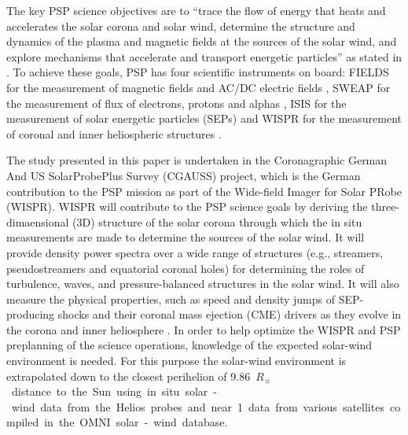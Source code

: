 \documentclass[]{aa}
\newcommand{\Rs}{$R_\sun{}$}
\begin{document}
        The key PSP science objectives are to “trace the flow of energy that heats and accelerates the solar corona and solar wind, determine the structure and dynamics of the plasma and magnetic fields at the sources of the solar wind, and explore mechanisms that accelerate and transport energetic particles” as stated in \citet{Fox2015}. To achieve these goals, PSP has four scientific instruments on board: FIELDS for the measurement of magnetic fields and AC/DC electric fields \citep{Bale2016}, SWEAP for the measurement of flux of electrons, protons and alphas \citep{Kasper2016}, IS\sun{}IS for the measurement of solar energetic particles (SEPs) \citep{McComas2016} and WISPR for the measurement of coronal and inner heliospheric structures \citep{Vourlidas2016}.

        The study presented in this paper is undertaken in the Coronagraphic German And US SolarProbePlus Survey (CGAUSS) project, which is the German contribution to the PSP mission as part of the Wide-field Imager for Solar PRobe (WISPR). WISPR will contribute to the PSP science goals by deriving the three-dimaensional (3D) structure of the solar corona through which the in situ measurements are made to determine the sources of the solar wind. It will provide density power spectra over a wide range of structures (e.g., streamers, pseudostreamers and equatorial coronal holes) for determining the roles of turbulence, waves, and pressure-balanced structures in the solar wind. It will also measure the physical properties, such as speed and density jumps of SEP-producing shocks and their coronal mass ejection (CME) drivers as they evolve in the corona and inner heliosphere \citep{Vourlidas2016}.
        In order to help optimize the WISPR and PSP preplanning of the science operations, knowledge of the expected solar-wind environment is needed. For this purpose the solar-wind environment is extrapolated down to the closest perihelion of \SI{9.86}{\Rs} distance to the Sun using in situ solar-wind data from the Helios probes and near \SI{1}{\au} data from various satellites compiled in the OMNI solar-wind database.
\end{document}

